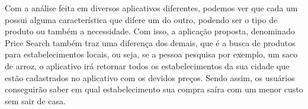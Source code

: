 Com a análise feita em diversos aplicativos diferentes, podemos ver que cada um possui alguma característica que difere um do outro, podendo ser o tipo de produto ou também a necessidade. Com isso, a aplicação proposta, denominado Price Search também traz uma diferença dos demais, que é a busca de produtos para estabelecimentos locais, ou seja, se a pessoa pesquisa por exemplo, um saco de arroz, o aplicativo irá retornar todos os estabelecimentos da sua cidade que estão cadastrados no aplicativo com os devidos preços. Sendo assim, os usuários conseguirão saber em qual estabelecimento sua compra saíra com um menor custo sem sair de casa.